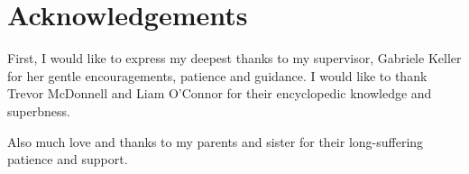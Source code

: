 \chapter*{Acknowledgements}\label{ack}

First, I would like to express my deepest thanks to my supervisor, Gabriele Keller for her gentle encouragements, patience and guidance. I would like to thank Trevor McDonnell and Liam O'Connor for their encyclopedic knowledge and superbness. 

Also much love and thanks to my parents and sister for their long-suffering patience and support.